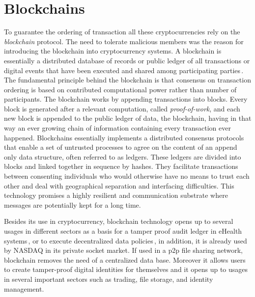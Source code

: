 \documentclass[USenglish]{uit-thesis}
\begin{document}
\section{Blockchains}
\label{sec:blockchains}
To guarantee the ordering of transaction all these
cryptocurrencies rely on the \emph{blockchain} protocol.
The need to tolerate malicious members was the reason for introducing
the blockchain into cryptocurrency systems.
A blockchain is essentially a distributed
database of records or public ledger of all transactions or
digital events that have been executed and
shared among participating parties\,\cite{crosby2016blockchain}.
The fundamental principle  behind the blockchain is that
consensus on transaction ordering is based on 
contributed computational power rather than number of participants. 
The blockchain works by appending transactions into blocks.
Every block is generated after a relevant computation, called
\emph{proof-of-work}, and each new block is
appended to the public ledger of data, the blockchain, having in
that way an ever growing chain of information
containing every transaction ever happened.
Blockchains essentially implements a distributed
consensus protocols that enable a set of untrusted
processes to agree on the content of an append only data structure,
often referred to as ledgers. 
These ledgers are divided into blocks and linked together in sequence by hashes. 
They facilitate transactions between consenting individuals
who would otherwise have no means to trust each other and
deal with geographical separation and interfacing difficulties.
This technology promises a highly resilient and
communication substrate where messages
are potentially kept for a long time.

Besides its use in cryptocurrency, blockchain technology
opens up to several usages in different sectors
as a basis for a tamper proof
audit ledger in eHealth systems\,\cite{Gjerdrum2016},
or to execute decentralized data policies\,\cite{lonet, codecaps},
in addition, it is already
used by NASDAQ in its private socket market. If used in a \gls{p2p}
file sharing network, blockchain removes the need of a centralized
data base. Moreover it allows users to create
tamper-proof digital identities for themselves and it
opens up to usages in several important sectors
such as trading, file storage, and identity management.
\end{document}
